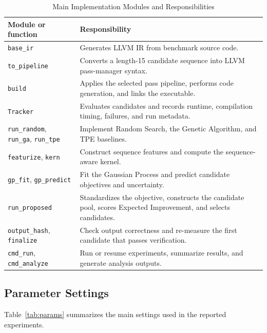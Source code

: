 \begin{table}[t]
\caption{Main Implementation Modules and Responsibilities}
\label{tab:modules}
\centering\footnotesize
\begin{tabularx}{\columnwidth}{@{}>{\raggedright\arraybackslash}p{2.1cm}X@{}}
\toprule
Module or function & Responsibility\\
\midrule
\texttt{base\_ir} & Generates LLVM IR from benchmark source code.\\
\texttt{to\_pipeline} & Converts a length-15 candidate sequence into LLVM pass-manager syntax.\\
\texttt{build} & Applies the selected pass pipeline, performs code generation, and links the executable.\\
\texttt{Tracker} & Evaluates candidates and records runtime, compilation timing, failures, and run metadata.\\
\texttt{run\_random}, \texttt{run\_ga}, \texttt{run\_tpe} & Implement Random Search, the Genetic Algorithm, and TPE baselines.\\
\texttt{featurize}, \texttt{kern} & Construct sequence features and compute the sequence-aware kernel.\\
\texttt{gp\_fit}, \texttt{gp\_predict} & Fit the Gaussian Process and predict candidate objectives and uncertainty.\\
\texttt{run\_proposed} & Standardizes the objective, constructs the candidate pool, scores Expected Improvement, and selects candidates.\\
\texttt{output\_hash}, \texttt{finalize} & Check output correctness and re-measure the first candidate that passes verification.\\
\texttt{cmd\_run}, \texttt{cmd\_analyze} & Run or resume experiments, summarize results, and generate analysis outputs.\\
\bottomrule
\end{tabularx}
\end{table}

\subsection{Parameter Settings}
Table~\ref{tab:params} summarizes the main settings used in the reported experiments.

